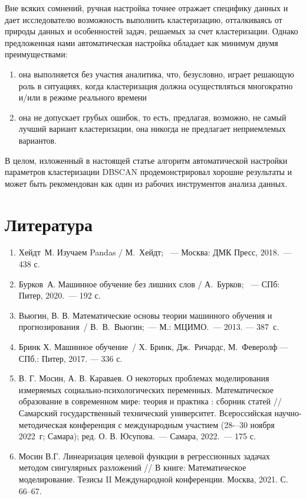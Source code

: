 \documentclass[a4paper,12pt]{article}
\begin{document}
Вне всяких сомнений, ручная настройка точнее отражает специфику данных и дает исследователю возможность выполнить кластеризацию, отталкиваясь от природы данных и особенностей задач, решаемых за счет кластеризации. Однако предложенная нами автоматическая настройка обладает как минимум двумя преимуществами:

\medskip\noindent
\begin{enumerate}
	\item она выполняется без участия аналитика, что, безусловно, играет решающую роль в ситуациях, когда кластеризация должна осуществляться многократно и/или в режиме реального времени
	\item она не допускает грубых ошибок, то есть, предлагая, возможно, не самый лучший вариант кластеризации, она никогда не предлагает неприемлемых вариантов.
\end{enumerate}

\medskip\noindent
В целом, изложенный в настоящей статье алгоритм автоматической настройки параметров кластеризации DBSCAN продемонстрировал хорошие результаты и может быть рекомендован как один из рабочих инструментов анализа данных.

\section{Литература}

\begin{enumerate}
	\item Хейдт М. Изучаем Pandas / М. Хейдт;  — Москва: ДМК Пресс, 2018. — 438 с.
	\item Бурков А. Машинное обучение без лишних слов / А. Бурков;  — СПб: Питер, 2020. — 192 с.
	\item Вьюгин, В. В. Математические основы теории машинного обучения и прогнозирования / В. В. Вьюгин; — М.: МЦИМО. — 2013. — 387~с.
	\item Бринк Х. Машинное обучение / Х. Бринк, Дж. Ричардс, М. Феверолф  — СПб.: Питер, 2017. — 336 с.
	\item В. Г. Мосин, А. В. Караваев. О некоторых проблемах моделирования измеряемых социально-психологических переменных. Математическое образование в современном мире: теория и практика : сборник статей // Самарский государственный технический университет. Всероссийская научно-методическая конференция с международным участием (28-–30 ноября 2022~г; Самара); ред. О. В. Юсупова.~--- Самара, 2022.~--- 175 с.
	\item Мосин В.Г. Линеаризация целевой функции в регрессионных задачах методом сингулярных разложений // В книге: Математическое моделирование. Тезисы II Международной конференции. Москва, 2021. С. 66--67.
\end{enumerate}
\end{document}
